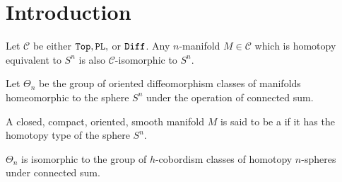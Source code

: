 \chapter{Introduction}


\begin{conjecture}\label{conj:generalized_poincare} Let $\mathscr{C}$ be either $\mathtt{Top}, \mathtt{PL},$ or $\mathtt{Diff}$. Any $n$-manifold $M\in \mathscr{C}$ which is homotopy equivalent to $S^n$ is also $\mathscr{C}$-isomorphic to $S^n$.
\end{conjecture}

\begin{definition}
  Let $\Theta_n$ be the group of oriented diffeomorphism classes of manifolds homeomorphic to the sphere $S^n$ under the operation of connected sum.
\end{definition}

\begin{definition}
  A closed, compact, oriented, smooth manifold $M$ is said to be a  if it has the homotopy type of the sphere $S^n$.
\end{definition}

\begin{theorem}
  $\Theta_n$ is isomorphic to the group of $h$-cobordism classes of homotopy $n$-spheres under connected sum.
\end{theorem}

\begin{definition}\label{defn:intersection_form}
\end{definition}
